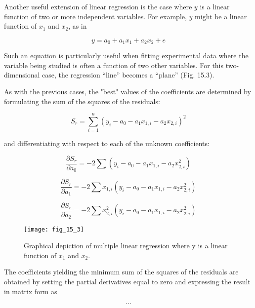\documentclass[../main.tex]{subfiles}
\begin{document}
\noindent Another useful extension of linear regression is the case where $y$ is a linear function of two or more independent variables. For example, $y$ might be a linear function of $x_1$ and $x_2$, as in

\begin{equation}
	y = a_0 + a_1x_1 + a_2x_2+e
\end{equation}

\noindent Such an equation is particularly useful when fitting experimental data where the variable being studied is often a function of two other variables. For this two-dimensional case, the regression ``line'' becomes a ``plane'' (Fig. 15.3).

As with the previous cases, the "best" values of the coefficients are determined by formulating the sum of the squares of the residuals:

\begin{equation}
	\tag{15.4}
	S_r = \sum_{i=1}^n (y_i - a_0 - a_1x_{1,i} - a_2x_{2,i})^2
\end{equation}

\noindent and differentiating with respect to each of the unknown coefficients:

\begin{equation}
	\frac{\partial S_r}{\partial a_0} = -2 \sum (y_i -a_0 -a_1x_{1,i} - a_2x_{2,i}^2)
\end{equation}

\begin{equation}
	\frac{\partial S_r}{\partial a_1} = -2 \sum x_{1,i} (y_i -a_0 -a_1x_{1,i} - a_2x_{2,i}^2)
\end{equation}

\begin{equation}
	\frac{\partial S_r}{\partial a_2} = -2 \sum x_{2,i}^2 (y_i -a_0 -a_1x_{1,i} - a_2x_{2,i}^2)
\end{equation}

\begin{wrapfigure}{l}{0.25\textwidth}
    \centering
    \texttt{[image: fig\_15\_3]}
   \caption{\textsf{Graphical depiction of multiple linear regression where y is a linear function of $x_1$ and $x_2$.}}
   \label{fig:fig_15_3}
\end{wrapfigure}

\noindent The coefficients yielding the minimum sum of the squares of the residuals are obtained by setting the partial derivatives equal to zero and expressing the result in matrix form as 

\begin{equation} %
...
\end{equation}
\end{document}
